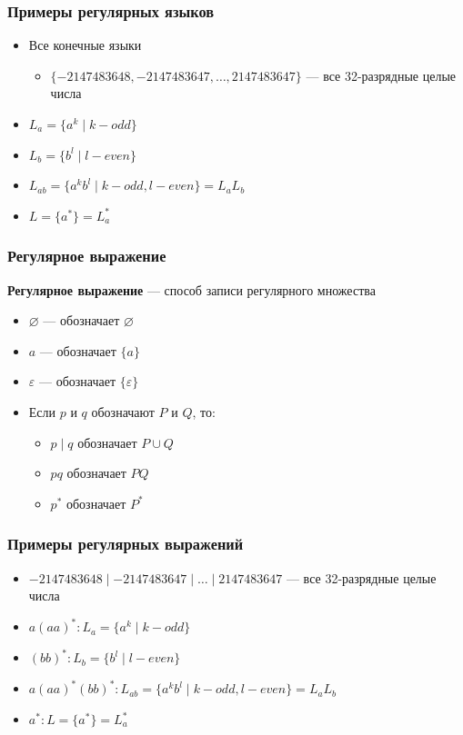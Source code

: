 \documentclass{beamer}
\begin{document}
\begin{frame}[fragile]
  \transwipe[direction=90]
  \frametitle{Примеры регулярных языков}
  \begin{itemize}
   \item Все конечные языки
    \begin{itemize}
     \item $\{-2 147 483 648, -2 147 483 647, \dots,  2 147 483 647\}$ --- все 32-разрядные целые числа
    \end{itemize}
    \item $L_a = \{a^k \mid k - odd \} $
    \item $L_b = \{b^l \mid l - even \} $
    \item $L_{ab} = \{a^k b^l \mid k - odd, l - even\} =  L_a L_b$   
    \item $L = \{a^*\} = L_a^*$
  \end{itemize}
  
  
\end{frame}

\begin{frame}[fragile]
  \transwipe[direction=90]
  \frametitle{Регулярное выражение}
    \textbf{Регулярное выражение} --- способ записи регулярного множества


    \begin{itemize}
      \item $\varnothing $ --- обозначает $\varnothing$
      \item $a$  --- обозначает $\{a\}$ 
      \item $\varepsilon$  --- обозначает $\{\varepsilon\}$ 
      \item Если $p$ и $q$ обозначают $P$ и $Q$, то:
      \begin{itemize}
        \item $p \mid q$ обозначает $P \cup Q$ 
        \item $pq$ обозначает $PQ$
        \item $p^*$ обозначает $P^*$
      \end{itemize}
    \end{itemize}
\end{frame}

\begin{frame}[fragile]
  \transwipe[direction=90]
  \frametitle{Примеры регулярных выражений}
  \begin{itemize}
    \item $-2 147 483 648 \mid -2 147 483 647 \mid \dots \mid  2 147 483 647$ --- все 32-разрядные целые числа
    \item $a(aa)^*: L_a = \{a^k \mid k - odd \} $
    \item $(bb)^*: L_b = \{b^l \mid l - even \} $
    \item $a(aa)^* (bb)^* :  L_{ab} = \{a^k b^l \mid k - odd, l - even\} =  L_a L_b$   
    \item $a^* : L = \{a^*\} = L_a^*$
  \end{itemize}
\end{frame}
\end{document}

